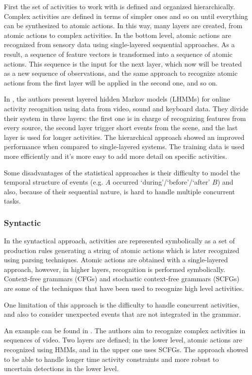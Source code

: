 First the set of activities to work with is defined and organized hierarchically.
Complex activities are defined in terms of simpler ones and so on until everything can be synthesized to atomic actions.
In this way, many layers are created, from atomic actions to complex activities.
In the bottom level, atomic actions are recognized from sensory data using single-layered sequential approaches. 
As a result, a sequence of feature vectors is transformed into a sequence of atomic actions.
This sequence is the input for the next layer, which now will be treated as a new sequence of observations, and the same approach to recognize atomic actions from the first layer will be applied in the second one, and so on.

In \citep{Oliver2002_LayRepHumActRec}, the authors present layered hidden Markov models (LHMMs) for online activity recognition using data from video, sound and keyboard data. 
They divide their system in three layers: the first one is in charge of recognizing features from every source, the second layer trigger short events from the scene, and the last layer is used for longer activities. 
The hierarchical approach showed an improved performance when compared to single-layered systems.
The training data is used more efficiently and it's more easy to add more detail on specific activities.

Some disadvantages of the statistical approaches is their difficulty to model the temporal structure of events (e.g. $A$ occurred `during'/`before'/`after' $B$) and also, because of their sequential nature, is hard to handle multiple concurrent tasks.

\subsubsection{Syntactic}
In the syntactical approach, activities are represented symbolically as a set of production rules generating a string of atomic actions which is later recognized using parsing techniques.
Atomic actions are obtained with a single-layered approach, however, in higher layers, recognition is performed symbolically.
Context-free grammars (CFGs) and stochastic context-free grammars (SCFGs) are some of the techniques that have been used to recognize high level activities.

One limitation of this approach is the difficulty to handle concurrent activities, and also to consider unexpected events that are not integrated in the grammar.

An example can be found in \citep{Ivanov2000_RecVisActSCFG}.
The authors aim to recognize complex activities in sequences of video.
Two layers are defined; in the lower level, atomic actions are recognized using HMMs, and in the upper one uses SCFGs.
The approach showed to be able to handle longer time activity constraints and more robust to uncertain detections in the lower level.


